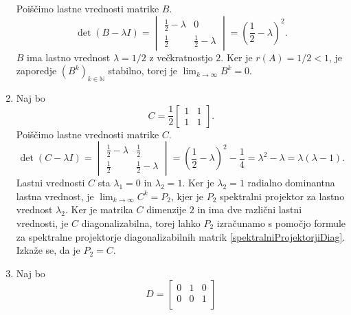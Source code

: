 \documentclass[mat1]{fmfdelo}
\newcommand{\N}{\mathbb N}
\begin{document}
\begin{zgled}
\begin{enumerate}
\begin{equation*}
        \end{equation*}
        Poiščimo lastne vrednosti matrike $B$.
        \begin{equation*}
            \det (B - \lambda I) =
            \begin{vmatrix}
                \frac{1}{2}-\lambda & 0 \\
                \frac{1}{2} & \frac{1}{2}-\lambda
            \end{vmatrix}
            = (\frac{1}{2}-\lambda)^2.
        \end{equation*}
        $B$ ima lastno vrednost $\lambda = 1/2$ z večkratnostjo $2$. Ker je $r(A) = 1/2 < 1$, je zaporedje $(B^k)_{k\in\N}$ stabilno, torej je $\lim_{k\rightarrow\infty} B^k = 0$.
        \item Naj bo
        \begin{equation*}
            C = \frac{1}{2}
            \begin{bmatrix}
                1 & 1 \\
                1 & 1
            \end{bmatrix}.
        \end{equation*}
        Poiščimo lastne vrednosti matrike $C$.
        \begin{equation*}
            \det (C - \lambda I) =
            \begin{vmatrix}
                \frac{1}{2}-\lambda & \frac{1}{2} \\
                \frac{1}{2} & \frac{1}{2}-\lambda
            \end{vmatrix}
            = (\frac{1}{2}-\lambda)^2-\frac{1}{4} = \lambda^2-\lambda = \lambda(\lambda - 1).
        \end{equation*}
        Lastni vrednosti $C$ sta $\lambda_1 = 0$ in $\lambda_2 = 1$. Ker je $\lambda_2 = 1$ radialno dominantna lastna vrednost, je $\lim_{k\rightarrow\infty} C^k = P_2$, kjer je $P_2$ spektralni projektor za lastno vrednost $\lambda_2$. Ker je matrika $C$ dimenzije $2$ in ima dve različni lastni vrednosti, je $C$ diagonalizabilna, torej lahko $P_2$ izračunamo s pomočjo formule za spektralne projektorje diagonalizabilnih matrik \eqref{spektralniProjektorjiDiag}. Izkaže se, da je $P_2 = C$.
        \item Naj bo
        \begin{equation*}
            D =
            \begin{bmatrix}
                0 & 1 & 0 \\
                0 & 0 & 1 \\

\end{bmatrix}
\end{equation*}
\end{enumerate}
\end{zgled}
\end{document}
